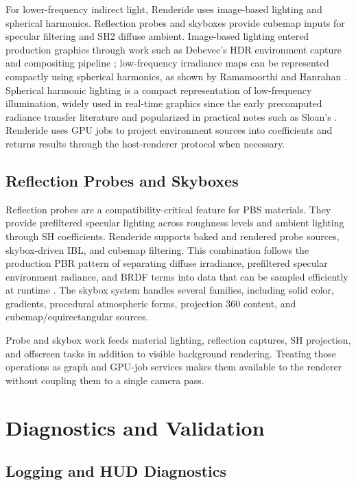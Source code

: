 \documentclass[acmtog,screen,nonacm]{acmart}
\begin{document}
For lower-frequency indirect light, Renderide uses image-based lighting and spherical harmonics. Reflection probes and skyboxes provide cubemap inputs for specular filtering and SH2 diffuse ambient. Image-based lighting entered production graphics through work such as Debevec's HDR environment capture and compositing pipeline \citep{debevec1998imageBasedLighting}; low-frequency irradiance maps can be represented compactly using spherical harmonics, as shown by Ramamoorthi and Hanrahan \citep{ramamoorthi2001irradiance,ramamoorthi2002signal}. Spherical harmonic lighting is a compact representation of low-frequency illumination, widely used in real-time graphics since the early precomputed radiance transfer literature and popularized in practical notes such as Sloan's \citep{sloan2019sh}. Renderide uses GPU jobs to project environment sources into coefficients and returns results through the host-renderer protocol when necessary.

\subsection{Reflection Probes and Skyboxes}

Reflection probes are a compatibility-critical feature for PBS materials. They provide prefiltered specular lighting across roughness levels and ambient lighting through SH coefficients. Renderide supports baked and rendered probe sources, skybox-driven IBL, and cubemap filtering. This combination follows the production PBR pattern of separating diffuse irradiance, prefiltered specular environment radiance, and BRDF terms into data that can be sampled efficiently at runtime \citep{karis2013real,lagarde2014frostbitePbr,filamentMaterials}. The skybox system handles several families, including solid color, gradients, procedural atmospheric forms, projection 360 content, and cubemap/equirectangular sources.

Probe and skybox work feeds material lighting, reflection captures, SH projection, and offscreen tasks in addition to visible background rendering. Treating those operations as graph and GPU-job services makes them available to the renderer without coupling them to a single camera pass.

\section{Diagnostics and Validation}

\subsection{Logging and HUD Diagnostics}
\end{document}
